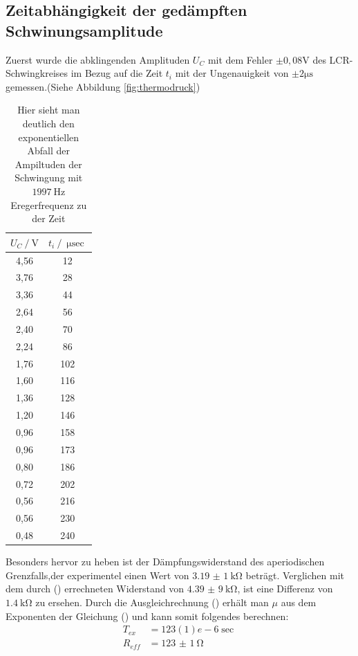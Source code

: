     \subsection[underline]{Zeitabhängigkeit der gedämpften Schwinungsamplitude}
    Zuerst wurde die abklingenden Amplituden $U_C$ mit dem Fehler $\pm{0,08}$$\si{\volt}$ des LCR-Schwingkreises im Bezug auf
    die Zeit $t_i$ mit der Ungenauigkeit von $\pm{2}$$\si{\micro\s}$ gemessen.(Siehe Abbildung \ref{fig:thermodruck})
    \begin{table}
      \centering
      \caption{Hier sieht man deutlich den exponentiellen Abfall der Ampiltuden der Schwingung mit $\SI{1997}{\hertz}$ Eregerfrequenz zu der Zeit}
      \label{tab:Daten1}
      \begin{tabular}{S S}
       \toprule
       {$U_C\:/\:\si{\volt}$} & {$t_i\:/\:\si{\micro\sec}$} \\
       ,56 & 12\\
      3,76 & 28\\
      3,36 & 44\\
      2,64 & 56\\
      2,40 & 70\\
      2,24 & 86\\
      1,76 & 102\\
      1,60 & 116\\
      1,36 & 128\\
      1,20 & 146\\
      0,96 & 158\\
      0,96 & 173\\
      0,80 & 186\\
      0,72 & 202\\
      0,56 & 216\\
      0,56 & 230\\
      0,48 & 240\\
       \bottomrule
      \end{tabular}
     \end{table}
    Besonders hervor zu heben ist der Dämpfungswiderstand des aperiodischen Grenzfalls,der experimentel einen Wert von $\SI{3,19(1)}{\kilo\ohm}$ beträgt.
    Verglichen mit dem durch () errechneten Widerstand von $\SI{4,39(9)}{\kilo\ohm}$, ist eine Differenz von ~ $\SI{1,4}{\kilo\ohm}$ zu ersehen.
    Durch die Ausgleichrechnung () erhält man $\mu$ aus dem Exponenten der Gleichung () und kann somit folgendes berechnen:
    \begin{align*}
     T_{ex} &= \si{123(1)e-6}{\sec}\\
     R_{eff} &= \SI{123(1)}{\ohm}
    \end{align*}
